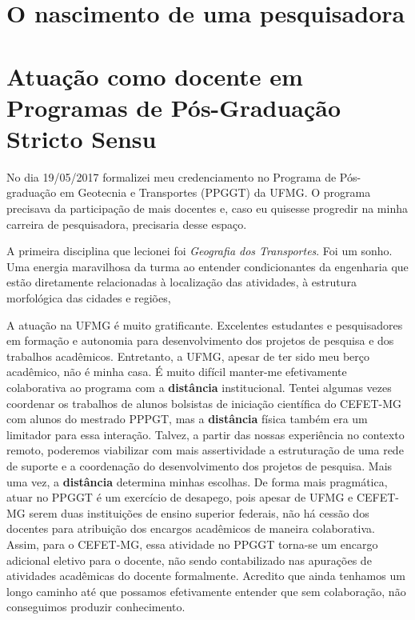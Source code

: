 \documentclass[
]{book}
\begin{document}
\hypertarget{o-nascimento-de-uma-pesquisadora}{%
\section{O nascimento de uma pesquisadora}\label{o-nascimento-de-uma-pesquisadora}}

\hypertarget{atuauxe7uxe3o-como-docente-em-programas-de-puxf3s-graduauxe7uxe3o-stricto-sensu}{%
\section{Atuação como docente em Programas de Pós-Graduação Stricto Sensu}\label{atuauxe7uxe3o-como-docente-em-programas-de-puxf3s-graduauxe7uxe3o-stricto-sensu}}

No dia 19/05/2017 formalizei meu credenciamento no Programa de Pós-graduação em Geotecnia e Transportes (PPGGT) da UFMG. O programa precisava da participação de mais docentes e, caso eu quisesse progredir na minha carreira de pesquisadora, precisaria desse espaço.

A primeira disciplina que lecionei foi \emph{Geografia dos Transportes}. Foi um sonho. Uma energia maravilhosa da turma ao entender condicionantes da engenharia que estão diretamente relacionadas à localização das atividades, à estrutura morfológica das cidades e regiões,

A atuação na UFMG é muito gratificante. Excelentes estudantes e pesquisadores em formação e autonomia para desenvolvimento dos projetos de pesquisa e dos trabalhos acadêmicos. Entretanto, a UFMG, apesar de ter sido meu berço acadêmico, não é minha casa. É muito difícil manter-me efetivamente colaborativa ao programa com a \textbf{distância} institucional. Tentei algumas vezes coordenar os trabalhos de alunos bolsistas de iniciação científica do CEFET-MG com alunos do mestrado PPPGT, mas a \textbf{distância} física também era um limitador para essa interação. Talvez, a partir das nossas experiência no contexto remoto, poderemos viabilizar com mais assertividade a estruturação de uma rede de suporte e a coordenação do desenvolvimento dos projetos de pesquisa. Mais uma vez, a \textbf{distância} determina minhas escolhas. De forma mais pragmática, atuar no PPGGT é um exercício de desapego, pois apesar de UFMG e CEFET-MG serem duas instituições de ensino superior federais, não há cessão dos docentes para atribuição dos encargos acadêmicos de maneira colaborativa. Assim, para o CEFET-MG, essa atividade no PPGGT torna-se um encargo adicional eletivo para o docente, não sendo contabilizado nas apurações de atividades acadêmicas do docente formalmente. Acredito que ainda tenhamos um longo caminho até que possamos efetivamente entender que sem colaboração, não conseguimos produzir conhecimento.
\end{document}
